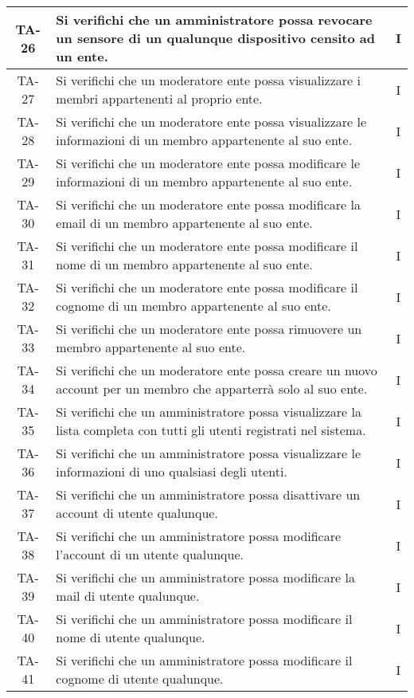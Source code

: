 \begin{center}
\begin{longtable}{|c|p{10cm}|c|}
			 \hline
			 TA-26 & Si verifichi che un amministratore possa revocare un sensore di un qualunque dispositivo censito ad un ente. & I \\
			 \hline
			 TA-27 &  Si verifichi che un moderatore ente possa visualizzare i membri appartenenti al proprio ente. & I \\
			 \hline
			 TA-28 & Si verifichi che un moderatore ente possa visualizzare le informazioni di un membro appartenente al suo ente. & I \\
			 \hline
			 TA-29 & Si verifichi che un moderatore ente possa modificare le informazioni di un membro appartenente al suo ente. & I \\
			 \hline
			 TA-30 & Si verifichi che un moderatore ente possa modificare la email di un membro appartenente al suo ente. & I \\
			 \hline
			 TA-31 & Si verifichi che un moderatore ente possa modificare il nome di un membro appartenente al suo ente. & I \\
			 \hline
			 TA-32 & Si verifichi che un moderatore ente possa modificare il cognome di un membro appartenente al suo ente. & I \\
			 \hline
			 TA-33 & Si verifichi che un moderatore ente possa rimuovere un membro appartenente al suo ente. & I \\
			 \hline
			 TA-34 & Si verifichi che un moderatore ente possa creare un nuovo account per un membro che apparterrà solo al suo ente. & I \\
			 \hline
			 TA-35 & Si verifichi che un amministratore possa visualizzare la lista completa con tutti gli utenti registrati nel sistema. & I \\
			 \hline
			 TA-36 & Si verifichi che un amministratore possa visualizzare le informazioni di uno qualsiasi degli utenti. & I \\
			 \hline
			 TA-37 & Si verifichi che un amministratore possa disattivare un account di utente qualunque. & I \\
			 \hline
			 TA-38 & Si verifichi che un amministratore possa modificare l'account di un utente qualunque. & I \\
			 \hline
			 TA-39 & Si verifichi che un amministratore possa modificare la mail di utente qualunque. & I \\
			 \hline
			 TA-40 & Si verifichi che un amministratore possa modificare il nome di utente qualunque. & I \\
			 \hline
			 TA-41 & Si verifichi che un amministratore possa modificare il cognome di utente qualunque. & I \\

\end{longtable}
\end{center}
